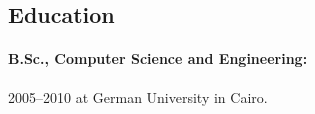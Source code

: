 \subsection{Education}
\paragraph{B.Sc., Computer Science and Engineering:}
2005--2010 at German University in Cairo.
